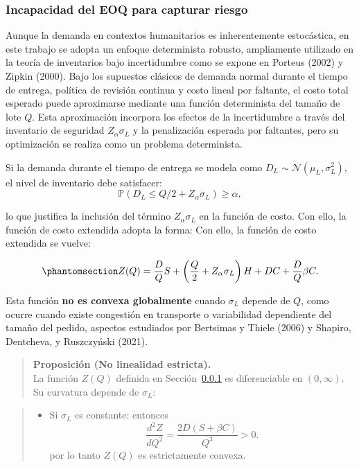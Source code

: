 \documentclass[
  spanish,
  us-letterpaper,
]{scrreprt}
\providecommand{\tightlist}{%
  \setlength{\itemsep}{0pt}\setlength{\parskip}{0pt}}
\numberwithin{equation}{section}
\begin{document}
\subsubsection{Incapacidad del EOQ para capturar riesgo}\label{sec-ZEOQ}

Aunque la demanda en contextos humanitarios es inherentemente
estocástica, en este trabajo se adopta un enfoque determinista robusto,
ampliamente utilizado en la teoría de inventarios bajo incertidumbre
como se expone en Porteus (2002) y Zipkin (2000). Bajo los supuestos
clásicos de demanda normal durante el tiempo de entrega, política de
revisión continua y costo lineal por faltante, el costo total esperado
puede aproximarse mediante una función determinista del tamaño de lote
\(Q\). Esta aproximación incorpora los efectos de la incertidumbre a
través del inventario de seguridad \(Z_\alpha \sigma_L\) y la
penalización esperada por faltantes, pero su optimización se realiza
como un problema determinista.

Si la demanda durante el tiempo de entrega se modela como
\(D_L \sim \mathcal{N}(\mu_L, \sigma_L^2)\), el nivel de inventario debe
satisfacer: \[
\mathbb{P}(D_L \leq Q/2 + Z_\alpha \sigma_L) \geq \alpha,
\]

lo que justifica la inclusión del término \(Z_\alpha \sigma_L\) en la
función de costo. Con ello, la función de costo extendida adopta la
forma: Con ello, la función de costo extendida se vuelve:

\begin{equation}\phantomsection\label{eq-Zq}{
Z(Q)=\frac{D}{Q}S+\left(\frac{Q}{2}+Z_\alpha\sigma_L\right)H+DC+\frac{D}{Q}\beta C. 
}\end{equation}

Esta función \textbf{no es convexa globalmente} cuando \(\sigma_L\)
depende de \(Q\), como ocurre cuando existe congestión en transporte o
variabilidad dependiente del tamaño del pedido, aspectos estudiados por
Bertsimas y Thiele (2006) y Shapiro, Dentcheva, y Ruszczyński (2021).

\begin{quote}
\textbf{Proposición (No linealidad estricta).}\\
La función \(Z(Q)\) definida en Sección~\ref{sec-ZEOQ} es diferenciable
en \((0,\infty)\). Su curvatura depende de \(\sigma_L\):
\end{quote}

\begin{quote}
\begin{itemize}
\tightlist
\item
  Si \(\sigma_L\) es constante: entonces \[
  \frac{d^2 Z}{dQ^2}=\frac{2D(S+\beta C)}{Q^3}>0.
  \] por lo tanto \(Z(Q)\) es estrictamente convexa.
\end{itemize}
\end{quote}
\end{document}
